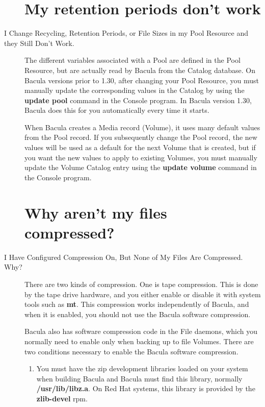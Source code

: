 \begin{description}
\label{periods}
\section{My retention periods don't work}
\item [I Change Recycling, Retention Periods, or File Sizes in my Pool
   Resource  and they Still Don't Work.]
  The different variables associated with a Pool are defined in the  Pool
  Resource, but are actually read by Bacula from the Catalog database.  On
  Bacula versions prior to 1.30, after changing your Pool Resource,  you must
  manually update the corresponding values in the Catalog by  using the {\bf
  update pool} command in the Console program. In Bacula  version 1.30, Bacula
  does this for you automatically every time it  starts.

  When Bacula creates a Media record (Volume), it uses many default  values from
  the Pool record. If you subsequently change the Pool  record, the new values
  will be used as a default for the next Volume  that is created, but if you
  want the new values to apply to existing  Volumes, you must manually update
  the Volume Catalog entry using  the {\bf update volume} command in the Console
  program.

\label{CompressionNotWorking}
\section{Why aren't my files compressed?}
\item [I Have Configured Compression On, But None of My Files Are
   Compressed.  Why?]
   There are two kinds of compression. One is tape compression. This  is done by
   the tape drive hardware, and you either enable or disable  it with system
   tools such as {\bf mt}. This compression works  independently of Bacula,
   and when it is enabled, you should not use the Bacula software
   compression.

   Bacula also has software compression code in the File daemons, which you
   normally need to enable only when backing up to file Volumes.  There are
   two conditions necessary to enable the Bacula software compression.

\begin{enumerate}
\item You must have the zip development libraries loaded on your system
   when building Bacula and Bacula must find this library, normally {\bf
   /usr/lib/libz.a}.  On Red Hat systems, this library is provided by the
   {\bf zlib-devel} rpm.


\end{enumerate}
\end{description}
